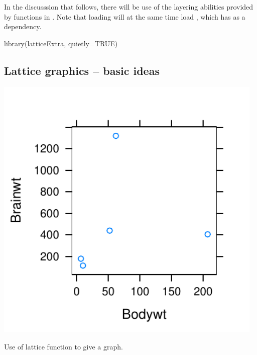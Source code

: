 In the discusssion that follows, there will be use of the layering
abilities provided by functions in .  Note that
loading  will at the same time load ,
which  has as a dependency.
\begin{Schunk}
\begin{Sinput}
library(latticeExtra, quietly=TRUE)
\end{Sinput}
\end{Schunk}

\subsection{Lattice graphics -- basic ideas}\label{ss:lat-gph}

\begin{marginfigure}
\begin{Schunk}


\centerline{\includegraphics[width=0.97\textwidth]{figs/07-cline-gph-1} }

\end{Schunk}
\caption{Use of lattice function  to give a graph.
  \label{fig:lat-gph}}
\end{marginfigure}

